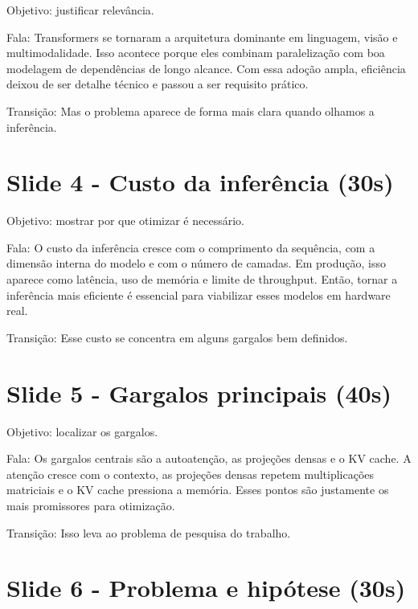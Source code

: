 Objetivo: justificar relevância.






Fala: Transformers se tornaram a arquitetura dominante em linguagem, visão e multimodalidade. Isso acontece porque eles combinam paralelização com boa modelagem de dependências de longo alcance. Com essa adoção ampla, eficiência deixou de ser detalhe técnico e passou a ser requisito prático.




Transição: Mas o problema aparece de forma mais clara quando olhamos a inferência.



\section{Slide 4 - Custo da inferência (30s)}


Objetivo: mostrar por que otimizar é necessário.






Fala: O custo da inferência cresce com o comprimento da sequência, com a dimensão interna do modelo e com o número de camadas. Em produção, isso aparece como latência, uso de memória e limite de throughput. Então, tornar a inferência mais eficiente é essencial para viabilizar esses modelos em hardware real.




Transição: Esse custo se concentra em alguns gargalos bem definidos.



\section{Slide 5 - Gargalos principais (40s)}


Objetivo: localizar os gargalos.






Fala: Os gargalos centrais são a autoatenção, as projeções densas e o KV cache. A atenção cresce com o contexto, as projeções densas repetem multiplicações matriciais e o KV cache pressiona a memória. Esses pontos são justamente os mais promissores para otimização.




Transição: Isso leva ao problema de pesquisa do trabalho.



\section{Slide 6 - Problema e hipótese (30s)}


